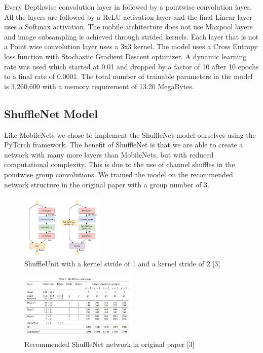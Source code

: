 \documentclass[10pt,twocolumn,letterpaper]{article}
\begin{document}
Every Depthwise convolution layer in followed by a pointwise convolution layer. All the layers are followed by a ReLU activation layer and the final Linear layer uses a Softmax activation. The mobile architecture does not use Maxpool layers and image subsampling is achieved through strided kernels. Each layer that is not a Point wise convolution layer uses a 3x3 kernel. The model uses a Cross Entropy loss function with Stochastic Gradient Descent optimizer. A dynamic learning rate was used which started at 0.01 and dropped by a factor of 10 after 10 epochs to a final rate of 0.0001. 
The total number of trainable parameters in the model is  3,260,600 with a memory requirement of 13.20 MegaBytes.   

\subsection{ShuffleNet Model}
Like MobileNets we chose to implement the ShuffleNet model ourselves using the PyTorch framework. The benefit of ShuffleNet is that we are able to create a network with many more layers than MobileNets, but with reduced computational complexity. This is due to the use of channel shuffles in the pointwise group convolutions. We trained the model on the recommended network structure in the original paper with a group number of 3.

\begin{figure}[ht]
\caption{ShuffleUnit with a kernel stride of 1 and a kernel stride of 2 [3]}
\centering
\includegraphics[width=0.35\textwidth]{shuffleunit}
\end{figure}


\begin{figure}[ht]
\caption{Recommended ShuffleNet network in original paper [3]}
\centering
\includegraphics[width=0.5\textwidth]{shufflenet}
\end{figure}
\end{document}
